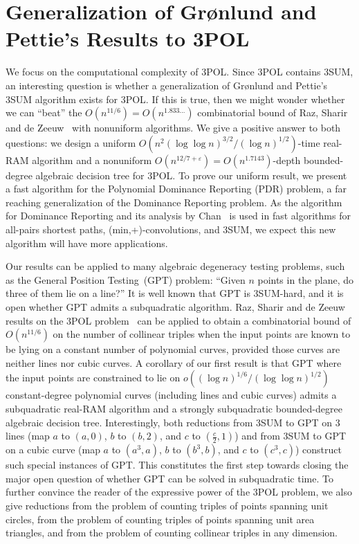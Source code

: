 \section{Generalization of Gr\o nlund and Pettie's Results to 3POL}

We focus on the computational complexity of 3POL\@. Since 3POL contains 3SUM,
an interesting question is whether a generalization of Gr\o nlund and Pettie's
3SUM algorithm exists for 3POL\@. If this is true, then we might wonder whether
we can ``beat'' the $O(n^{11/6}) = O(n^{1.833\ldots})$ combinatorial bound of Raz,
Sharir and de Zeeuw~\cite{RSZ15} with nonuniform algorithms. We give a positive
answer to both questions: we design
a uniform
$O(n^2 {(\log \log n)}^{3/2} / {(\log n)}^{1/2})$-time
real-RAM algorithm
and
a nonuniform
$O(n^{12/7+\varepsilon}) = O(n^{1.7143})$-depth
bounded-degree algebraic decision tree
for 3POL\@.
%
To prove our uniform result, we present a fast algorithm for the Polynomial
Dominance Reporting (PDR) problem, a far reaching generalization of the
Dominance Reporting problem. As the algorithm for Dominance Reporting and its
analysis by Chan~\cite{Cha08} is used in fast algorithms for all-pairs shortest
paths, (min,+)-convolutions, and 3SUM, we expect this new algorithm will have
more applications.

Our results can be applied to many algebraic degeneracy testing problems, such
as the General Position Testing~(GPT) problem: ``Given $n$ points in the plane, do
three of them lie on a line?'' It is well known that GPT is 3SUM-hard,
and it is open whether GPT admits a subquadratic algorithm. Raz, Sharir
and de Zeeuw results on the 3POL problem~\cite{RSZ15} can be applied to obtain
a combinatorial bound of $O(n^{11/6})$ on the
number of collinear triples when the input points are known to be lying on
a constant number of polynomial curves, provided those curves are neither
lines nor cubic curves. A corollary of our first result is that
GPT where the input points are constrained to lie on
$o({(\log n)}^{1/6}/{(\log \log n)}^{1/2})$
constant-degree polynomial curves (including lines and cubic curves)
admits a subquadratic real-RAM algorithm and
a strongly subquadratic bounded-degree algebraic decision tree.
Interestingly, both reductions from 3SUM to GPT on 3 lines (map $a$ to $(a,0)$,
$b$ to $(b,2)$, and $c$ to $(\frac c2, 1)$) and from 3SUM to GPT on a
cubic curve (map $a$ to $(a^3,a)$, $b$ to $(b^3,b)$, and $c$ to $(c^3,c)$)
construct such special instances of GPT\@.
This constitutes the first step towards closing the major open question of
whether GPT can be solved in subquadratic time.
%
To further convince the reader of the expressive power of the 3POL problem,
we also give reductions from the problem of counting triples of points spanning
unit circles, from the problem of counting triples of points spanning unit area
triangles, and from the problem of counting collinear triples in any dimension.

